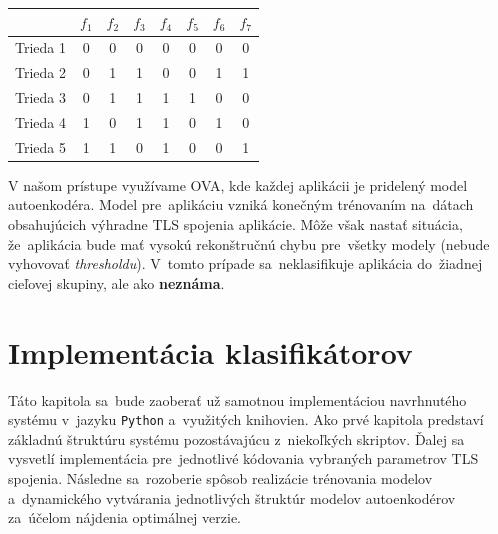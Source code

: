 \begin{itemize}
\begin{table}[H]
\begin{tabular}{|c|c|c|c|c|c|c|c|}
    \hline
            & $f_1$ & $f_2$ & $f_3$ & $f_4$ & $f_5$ & $f_6$ & $f_7$ \\ \hline
    Trieda 1 & 0     & 0     & 0     & 0     & 0     & 0     & 0     \\ \hline
    Trieda 2 & 0     & 1     & 1     & 0     & 0     & 1     & 1     \\ \hline
    Trieda 3 & 0     & 1     & 1     & 1     & 1     & 0     & 0     \\ \hline
    Trieda 4 & 1     & 0     & 1     & 1     & 0     & 1     & 0     \\ \hline
    Trieda 5 & 1     & 1     & 0     & 1     & 0     & 0     & 1     \\ \hline
    \end{tabular}
    \end{table}
\end{itemize}
V našom prístupe využívame OVA, kde každej aplikácii je pridelený model autoenkodéra. Model pre~aplikáciu vzniká konečným trénovaním na~dátach obsahujúcich výhradne TLS spojenia aplikácie. Môže však nastať situácia, že~aplikácia bude mať vysokú rekonštručnú chybu pre~všetky modely (nebude vyhovovať \textit{thresholdu}). V~tomto prípade sa~neklasifikuje aplikácia do~žiadnej cieľovej skupiny, ale ako \textbf{neznáma}.

\chapter{Implementácia klasifikátorov}\label{implementation}
Táto kapitola sa~bude zaoberať už samotnou implementáciou navrhnutého systému v~jazyku \texttt{Python} a~využitých knihovien. Ako prvé kapitola predstaví základnú štruktúru systému pozostávajúcu z~niekoľkých skriptov. Ďalej sa vysvetlí implementácia pre~jednotlivé kódovania vybraných parametrov TLS spojenia. Následne sa~rozoberie spôsob realizácie trénovania modelov a~dynamického vytvárania jednotlivých štruktúr modelov autoenkodérov za~účelom nájdenia optimálnej verzie. 

